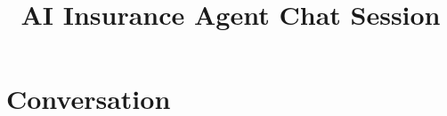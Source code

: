 \documentclass[a4paper,12pt]{article}
\title{AI Insurance Agent Chat Session}
\author{}
\date{}
\begin{document}
\maketitle

\section*{Conversation}

\end{document}
